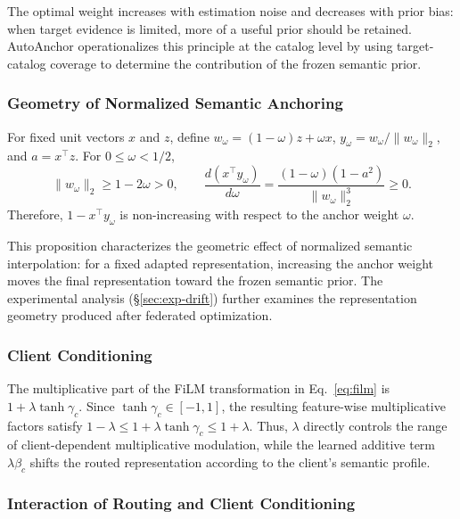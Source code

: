 The optimal weight increases with estimation noise and decreases with prior bias: when target evidence is limited, more of a useful prior should be retained. AutoAnchor operationalizes this principle at the catalog level by using target-catalog coverage to determine the contribution of the frozen semantic prior.

\subsubsection{Geometry of Normalized Semantic Anchoring}

\begin{proposition}
\label{thm:drift}
For fixed unit vectors $x$ and $z$, define $w_\omega=(1-\omega)z+\omega x$, $y_\omega=w_\omega/\|w_\omega\|_2$, and $a=x^\top z$. For $0\le\omega<1/2$,
\begin{equation}
\|w_\omega\|_2\ge1-2\omega>0,
\qquad
\frac{d(x^\top y_\omega)}{d\omega}
=\frac{(1-\omega)(1-a^2)}{\|w_\omega\|_2^3}\ge0.
\label{eq:drift}
\end{equation}
Therefore, $1-x^\top y_\omega$ is non-increasing with respect to the anchor weight $\omega$.
\end{proposition}

This proposition characterizes the geometric effect of normalized semantic interpolation: for a fixed adapted representation, increasing the anchor weight moves the final representation toward the frozen semantic prior. The experimental analysis (\S\ref{sec:exp-drift}) further examines the representation geometry produced after federated optimization.

\subsubsection{Client Conditioning}

The multiplicative part of the FiLM transformation in Eq.~\eqref{eq:film} is $1+\lambda\tanh\gamma_c$. Since $\tanh\gamma_c\in[-1,1]$, the resulting feature-wise multiplicative factors satisfy $1-\lambda\le1+\lambda\tanh\gamma_c\le1+\lambda$. Thus, $\lambda$ directly controls the range of client-dependent multiplicative modulation, while the learned additive term $\lambda\beta_c$ shifts the routed representation according to the client's semantic profile.

\subsubsection{Interaction of Routing and Client Conditioning}

